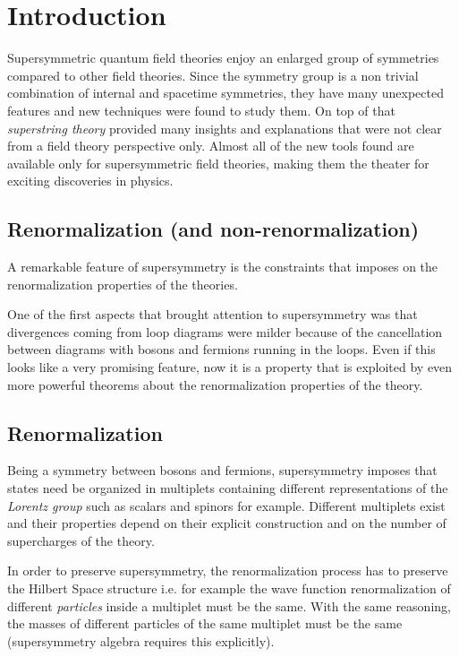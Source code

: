 \begin{comment}
	---- OUTLINE-----
	***Supersimmetria:
		~ + simmetria = + strumenti per studiare teorie
		~Non renormalization theorems (perturbative)
		~ milder divergence 
		~exact results (e.g. superpotential, witten index , exact beta function )
		~Holomorphicity, couplings as background fields (important is smoothness of weak coupling limits, e.g. classic limit g in 0 well defined.
		Use of wilsonian action: no IR divergences)
		~moduli spaces
		--Superconformal group-- more relations, r charge, dimensions ecc
		~brane constructions?
		~Superconformal index
		~Localizations

\end{comment}
\section{Introduction}
Supersymmetric quantum field theories enjoy an enlarged group of  symmetries compared to other field theories. 
Since the symmetry group is a non trivial combination of internal and spacetime symmetries, they have many unexpected features and new techniques were found to study them.
On top of that \emph{superstring theory} provided many insights and explanations that were not clear from a field theory perspective only. 
Almost all of the new tools found are available only for supersymmetric field theories, making them the theater for exciting discoveries in physics.


\subsection{ Renormalization (and non-renormalization)}

A remarkable feature of supersymmetry is the constraints that imposes on the renormalization properties of the theories.

One of the first aspects that brought attention to supersymmetry was that divergences coming from loop diagrams were milder because of the cancellation between diagrams with bosons and fermions running in the loops. 
Even if this looks like a very promising feature, now it is a property that is exploited by even more powerful theorems about the renormalization properties of the theory.


\subsection{Renormalization}
Being a symmetry between bosons and fermions, supersymmetry imposes that states need be organized in multiplets containing different representations of the \emph{Lorentz group} such as scalars and spinors for example. Different multiplets exist and their properties depend on their explicit construction and on the number of supercharges of the theory.


In order to preserve supersymmetry, the renormalization process has to preserve the Hilbert Space structure i.e. for example the wave function renormalization of different \emph{ particles} inside a multiplet must be the same. 
With the same reasoning, the masses of different particles of the same multiplet must be the same (supersymmetry algebra requires this explicitly). 